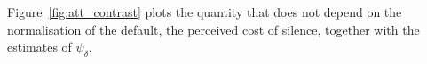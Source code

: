 Figure~\ref{fig:att_contrast} plots the quantity that does not depend on the normalisation of the default, the perceived cost of silence, together with the estimates of $\psi_\delta$.
